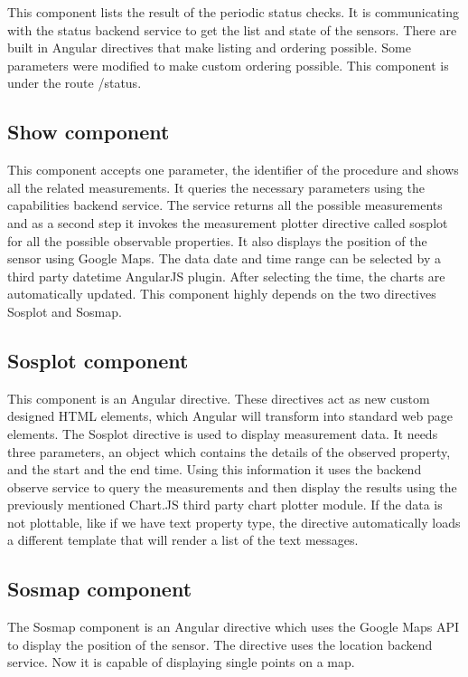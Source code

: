 This component lists the result of the periodic status checks. 
It is communicating with the status backend service to get the list and state of the sensors.
There are built in Angular directives that make listing and ordering possible. Some parameters were modified to make custom ordering possible. This component is under the route /status.

\subsection{Show component}

This component accepts one parameter, the identifier of the procedure and shows all the related measurements. It queries the necessary parameters using the capabilities backend service. The service returns all the possible measurements and as a second step it invokes the measurement plotter directive called sosplot for all the possible observable properties.
It also displays the position of the sensor using Google Maps. 
The data date and time range can be selected by a third party datetime AngularJS plugin. After selecting the time, the charts are automatically updated. This component highly depends on the two directives Sosplot and Sosmap.

\subsection{Sosplot component}
This component is an Angular directive. These directives act as new custom designed HTML elements, which Angular will transform into standard web page elements. The Sosplot directive is used to display measurement data. It needs three parameters, an object which contains the details of the observed property, and the start and the end time. Using this information it uses the backend observe service to query the measurements and then display the results using the previously mentioned Chart.JS third party chart plotter module. If the data is not plottable, like if we have text property type, the directive automatically loads a different template that will render a list of the text messages. 

\subsection{Sosmap component}
The Sosmap component is an Angular directive which uses the Google Maps API to display the position of the sensor. The directive uses the location backend service. Now it is capable of displaying single points on a map.

